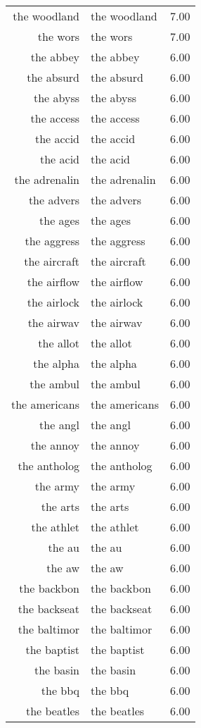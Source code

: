 \begin{table}[ht]
\begin{tabular}{rlr}
  the woodland & the woodland & 7.00 \\ 
  the wors & the wors & 7.00 \\ 
  the abbey & the abbey & 6.00 \\ 
  the absurd & the absurd & 6.00 \\ 
  the abyss & the abyss & 6.00 \\ 
  the access & the access & 6.00 \\ 
  the accid & the accid & 6.00 \\ 
  the acid & the acid & 6.00 \\ 
  the adrenalin & the adrenalin & 6.00 \\ 
  the advers & the advers & 6.00 \\ 
  the ages & the ages & 6.00 \\ 
  the aggress & the aggress & 6.00 \\ 
  the aircraft & the aircraft & 6.00 \\ 
  the airflow & the airflow & 6.00 \\ 
  the airlock & the airlock & 6.00 \\ 
  the airwav & the airwav & 6.00 \\ 
  the allot & the allot & 6.00 \\ 
  the alpha & the alpha & 6.00 \\ 
  the ambul & the ambul & 6.00 \\ 
  the americans & the americans & 6.00 \\ 
  the angl & the angl & 6.00 \\ 
  the annoy & the annoy & 6.00 \\ 
  the antholog & the antholog & 6.00 \\ 
  the army & the army & 6.00 \\ 
  the arts & the arts & 6.00 \\ 
  the athlet & the athlet & 6.00 \\ 
  the au & the au & 6.00 \\ 
  the aw & the aw & 6.00 \\ 
  the backbon & the backbon & 6.00 \\ 
  the backseat & the backseat & 6.00 \\ 
  the baltimor & the baltimor & 6.00 \\ 
  the baptist & the baptist & 6.00 \\ 
  the basin & the basin & 6.00 \\ 
  the bbq & the bbq & 6.00 \\ 
  the beatles & the beatles & 6.00 \\ 

\end{tabular}
\end{table}
